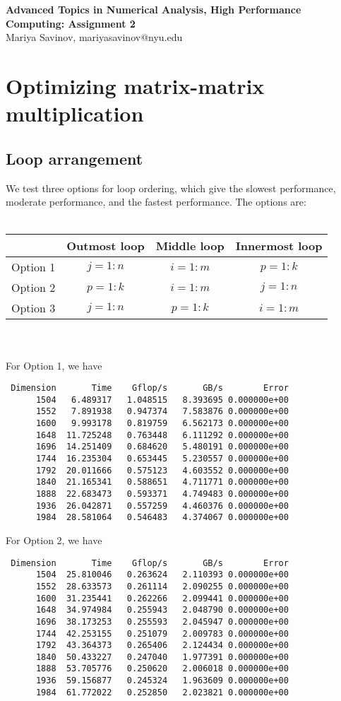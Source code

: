 \documentclass[10pt, letterpaper]{article}
\begin{document}
\begin{center}
{\bf
Advanced Topics in Numerical Analysis, High Performance Computing: \textbf{Assignment 2} \\
}
Mariya Savinov, mariyasavinov@nyu.edu
\end{center}

\section{Optimizing matrix-matrix multiplication}
\subsection{Loop arrangement}
We test three options for loop ordering, which give the slowest performance, moderate performance, and the fastest performance. The options are:\\\\
\begin{tabular}{|c|c|c|c|}
  \hline
   & Outmost loop & Middle loop & Innermost loop \\ \hline \hline
  Option 1 & $j=1:n$ & $i=1:m$ & $p=1:k$  \\ \hline
  Option 2 & $p=1:k$ & $i=1:m$ & $j=1:n$  \\ \hline
  Option 3 & $j=1:n$ & $p=1:k$ & $i=1:m$ \\ \hline
  \hline
\end{tabular}\\\\
For Option 1, we have
\begin{verbatim}
 Dimension       Time    Gflop/s       GB/s        Error
      1504   6.489317   1.048515   8.393695 0.000000e+00
      1552   7.891938   0.947374   7.583876 0.000000e+00
      1600   9.993178   0.819759   6.562173 0.000000e+00
      1648  11.725248   0.763448   6.111292 0.000000e+00
      1696  14.251409   0.684620   5.480191 0.000000e+00
      1744  16.235304   0.653445   5.230557 0.000000e+00
      1792  20.011666   0.575123   4.603552 0.000000e+00
      1840  21.165341   0.588651   4.711771 0.000000e+00
      1888  22.683473   0.593371   4.749483 0.000000e+00
      1936  26.042871   0.557259   4.460376 0.000000e+00
      1984  28.581064   0.546483   4.374067 0.000000e+00
\end{verbatim}
For Option 2, we have
\begin{verbatim}
 Dimension       Time    Gflop/s       GB/s        Error
      1504  25.810046   0.263624   2.110393 0.000000e+00
      1552  28.633573   0.261114   2.090255 0.000000e+00
      1600  31.235441   0.262266   2.099441 0.000000e+00
      1648  34.974984   0.255943   2.048790 0.000000e+00
      1696  38.173253   0.255593   2.045947 0.000000e+00
      1744  42.253155   0.251079   2.009783 0.000000e+00
      1792  43.364373   0.265406   2.124434 0.000000e+00
      1840  50.433227   0.247040   1.977391 0.000000e+00
      1888  53.705776   0.250620   2.006018 0.000000e+00
      1936  59.156877   0.245324   1.963609 0.000000e+00
      1984  61.772022   0.252850   2.023821 0.000000e+00
\end{verbatim}
\end{document}
